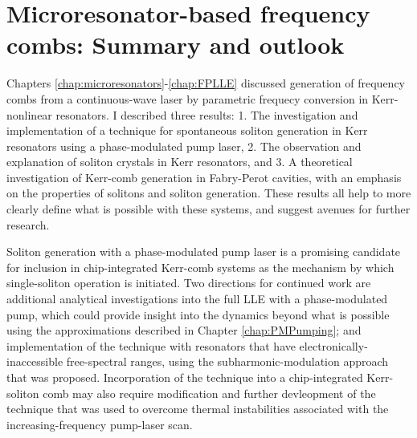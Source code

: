  \chapter{Microresonator-based frequency combs: Summary and outlook}\label{chap:conclusion}

Chapters \ref{chap:microresonators}-\ref{chap:FPLLE} discussed generation of frequency combs from a continuous-wave laser by parametric frequecy conversion in Kerr-nonlinear resonators. I described three results: 1. The investigation and implementation of a technique for spontaneous soliton generation in Kerr resonators using a phase-modulated pump laser, 2. The observation and explanation of soliton crystals in Kerr resonators, and 3. A theoretical investigation of Kerr-comb generation in Fabry-Perot cavities, with an emphasis on the properties of solitons and soliton generation. These results all help to more clearly define what is possible with these systems, and suggest avenues for further research. 

Soliton generation with a phase-modulated pump laser is a promising candidate for inclusion in chip-integrated Kerr-comb systems as the mechanism by which single-soliton operation is initiated. Two directions for continued work are additional analytical investigations into the full LLE with a phase-modulated pump, which could provide insight into the dynamics beyond what is possible using the approximations described in Chapter \ref{chap:PMPumping}; and implementation of the technique with resonators that have electronically-inaccessible free-spectral ranges, using the subharmonic-modulation approach that was proposed. Incorporation of the technique into a chip-integrated Kerr-soliton comb may also require modification and further devleopment of the technique that was used to overcome thermal instabilities associated with the increasing-frequency pump-laser scan.

